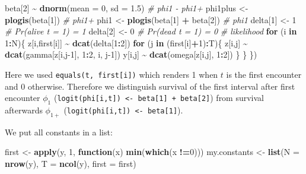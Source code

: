 \documentclass[
  12pt,
]{krantz}
\newenvironment{Shaded}{\begin{snugshade}}{\end{snugshade}}
\newcommand{\AttributeTok}[1]{\textcolor[rgb]{0.13,0.29,0.53}{#1}}
\newcommand{\CommentTok}[1]{\textcolor[rgb]{0.56,0.35,0.01}{\textit{#1}}}
\newcommand{\ControlFlowTok}[1]{\textcolor[rgb]{0.13,0.29,0.53}{\textbf{#1}}}
\newcommand{\DecValTok}[1]{\textcolor[rgb]{0.00,0.00,0.81}{#1}}
\newcommand{\FloatTok}[1]{\textcolor[rgb]{0.00,0.00,0.81}{#1}}
\newcommand{\FunctionTok}[1]{\textcolor[rgb]{0.13,0.29,0.53}{\textbf{#1}}}
\newcommand{\NormalTok}[1]{#1}
\newcommand{\OtherTok}[1]{\textcolor[rgb]{0.56,0.35,0.01}{#1}}
\newcommand{\SpecialCharTok}[1]{\textcolor[rgb]{0.81,0.36,0.00}{\textbf{#1}}}
\begin{document}
\begin{Shaded}
\begin{Highlighting}[]
\NormalTok{  beta[}\DecValTok{2}\NormalTok{] }\SpecialCharTok{\textasciitilde{}} \FunctionTok{dnorm}\NormalTok{(}\AttributeTok{mean =} \DecValTok{0}\NormalTok{, }\AttributeTok{sd =} \FloatTok{1.5}\NormalTok{) }\CommentTok{\# phi1 {-} phi1+}
\NormalTok{  phi1plus }\OtherTok{\textless{}{-}} \FunctionTok{plogis}\NormalTok{(beta[}\DecValTok{1}\NormalTok{])         }\CommentTok{\# phi1+}
\NormalTok{  phi1 }\OtherTok{\textless{}{-}} \FunctionTok{plogis}\NormalTok{(beta[}\DecValTok{1}\NormalTok{] }\SpecialCharTok{+}\NormalTok{ beta[}\DecValTok{2}\NormalTok{])   }\CommentTok{\# phi1}
\NormalTok{  delta[}\DecValTok{1}\NormalTok{] }\OtherTok{\textless{}{-}} \DecValTok{1}          \CommentTok{\# Pr(alive t = 1) = 1}
\NormalTok{  delta[}\DecValTok{2}\NormalTok{] }\OtherTok{\textless{}{-}} \DecValTok{0}          \CommentTok{\# Pr(dead t = 1) = 0}
  \CommentTok{\# likelihood}
  \ControlFlowTok{for}\NormalTok{ (i }\ControlFlowTok{in} \DecValTok{1}\SpecialCharTok{:}\NormalTok{N)\{}
\NormalTok{    z[i,first[i]] }\SpecialCharTok{\textasciitilde{}} \FunctionTok{dcat}\NormalTok{(delta[}\DecValTok{1}\SpecialCharTok{:}\DecValTok{2}\NormalTok{])}
    \ControlFlowTok{for}\NormalTok{ (j }\ControlFlowTok{in}\NormalTok{ (first[i]}\SpecialCharTok{+}\DecValTok{1}\NormalTok{)}\SpecialCharTok{:}\NormalTok{T)\{}
\NormalTok{      z[i,j] }\SpecialCharTok{\textasciitilde{}} \FunctionTok{dcat}\NormalTok{(gamma[z[i,j}\DecValTok{{-}1}\NormalTok{], }\DecValTok{1}\SpecialCharTok{:}\DecValTok{2}\NormalTok{, i, j}\DecValTok{{-}1}\NormalTok{])}
\NormalTok{      y[i,j] }\SpecialCharTok{\textasciitilde{}} \FunctionTok{dcat}\NormalTok{(omega[z[i,j], }\DecValTok{1}\SpecialCharTok{:}\DecValTok{2}\NormalTok{])}
\NormalTok{    \}}
\NormalTok{  \}}
\NormalTok{\})}
\end{Highlighting}
\end{Shaded}

Here we used \texttt{equals(t,\ first{[}i{]})} which renders 1 when \(t\) is the first encounter and 0 otherwise. Therefore we distinguish survival of the first interval after first encounter \(\phi_1\) (\texttt{logit(phi{[}i,t{]})\ \textless{}-\ beta{[}1{]}\ +\ beta{[}2{]}}) from survival afterwards \(\phi_{1+}\) (\texttt{logit(phi{[}i,t{]})\ \textless{}-\ beta{[}1{]}}).

We put all constants in a list:

\begin{Shaded}
\begin{Highlighting}[]
\NormalTok{first }\OtherTok{\textless{}{-}} \FunctionTok{apply}\NormalTok{(y, }\DecValTok{1}\NormalTok{, }\ControlFlowTok{function}\NormalTok{(x) }\FunctionTok{min}\NormalTok{(}\FunctionTok{which}\NormalTok{(x }\SpecialCharTok{!=}\DecValTok{0}\NormalTok{)))}
\NormalTok{my.constants }\OtherTok{\textless{}{-}} \FunctionTok{list}\NormalTok{(}\AttributeTok{N =} \FunctionTok{nrow}\NormalTok{(y), }
                     \AttributeTok{T =} \FunctionTok{ncol}\NormalTok{(y), }
                     \AttributeTok{first =}\NormalTok{ first)}
\end{Highlighting}
\end{Shaded}
\end{document}
